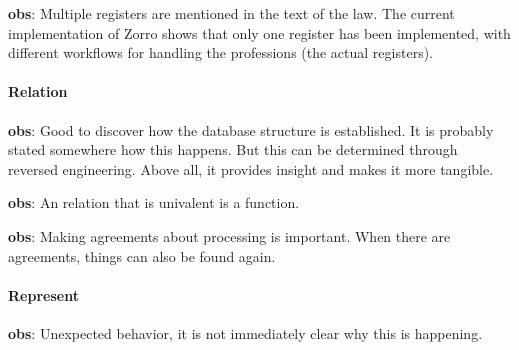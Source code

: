 \begin{obs}\label{obs:rq3-8:19-9}
    \textbf{obs}: Multiple registers are mentioned in the text of the law.
    The current implementation of Zorro shows that only one register has been implemented, with different workflows for handling the professions (the actual registers).

\end{obs}

\paragraph{Relation}
\begin{obs}\label{obs:rq1-7:10-11}
    \textbf{obs}: Good to discover how the database structure is established.
    It is probably stated somewhere how this happens.
    But this can be determined through reversed engineering.
    Above all, it provides insight and makes it more tangible.
\end{obs}

\begin{obs}\label{obs:rq2-11:19-10}
    \textbf{obs}: An relation that is univalent is a function.
\end{obs}

\begin{obs}\label{obs:rq2-10:19-10}
    \textbf{obs}: Making agreements about processing is important.
    When there are agreements, things can also be found again.
\end{obs}
    
\paragraph{Represent}
\begin{obs}\label{obs:rq1-50:30-10}
    \textbf{obs}: Unexpected behavior, it is not immediately clear why this is happening.
\end{obs}

